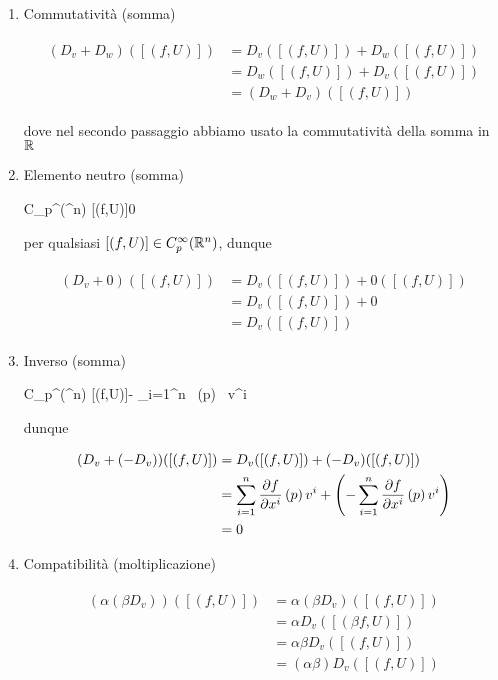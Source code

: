{\begin{enumerate}
	\item Commutatività (somma)
	
	\begin{align}
		\begin{split}
			(D_{v} + D_{w}) ([(f,U)]) &= D_{v} ([(f,U)]) + D_{w} ([(f,U)]) \\
			&= D_{w} ([(f,U)]) + D_{v} ([(f,U)]) \\
			&= (D_{w} + D_{v}) ([(f,U)])
		\end{split}
	\end{align}
	
	dove nel secondo passaggio abbiamo usato la commutatività della somma in $ \mathbb{R} $
	
	\item Elemento neutro (somma)
	
		{C_{p}^{\infty}(\R^{n})}{\R}
		{[(f,U)]}{0}
	
	per qualsiasi $ [(f,U)] \in C_{p}^{\infty}(\mathbb{R}^{n}) $, dunque
	
	\begin{align}
		\begin{split}
			(D_{v} + 0) ([(f,U)]) &= D_{v} ([(f,U)]) + 0 ([(f,U)]) \\
			&= D_{v} ([(f,U)]) + 0 \\
			&= D_{v} ([(f,U)])
		\end{split}
	\end{align}
	
	\item Inverso (somma)
	
		{C_{p}^{\infty}(\R^{n})}{\R}
		{[(f,U)]}{- \sum_{i=1}^{n}  \, (p) \, v^{i}}
	
	dunque
	
	\begin{align}
		\begin{split}
			(D_{v} + (- D_{v})) ([(f,U)]) &= D_{v} ([(f,U)]) + (- D_{v}) ([(f,U)]) \\
			&= \sum_{i=1}^{n} \pdv{f}{x^{i}} \, (p) \, v^{i} + \left( - \sum_{i=1}^{n} \pdv{f}{x^{i}} \, (p) \, v^{i} \right) \\
			&= 0
		\end{split}
	\end{align}
	
	\item Compatibilità (moltiplicazione)
	
	\begin{align}
		\begin{split}
			(\alpha (\beta D_{v})) ([(f,U)]) &= \alpha (\beta D_{v}) ([(f,U)]) \\
			&= \alpha D_{v} ([(\beta f,U)]) \\
			&= \alpha \beta D_{v} ([(f,U)]) \\
			&= (\alpha \beta) D_{v} ([(f,U)])
		\end{split}
	\end{align}
	

\end{enumerate}}
